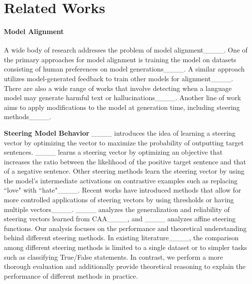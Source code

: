 \section{Related Works}
\paragraph{Model Alignment} A wide body of research addresses the problem of model alignment____. One of the primary approaches for model alignment is training the model on datasets consisting of human preferences on model generations____. A similar approach utilizes model-generated feedback to train other models for alignment____. There are also a wide range of works that involve detecting when a language model may generate harmful text or hallucinations____. Another line of work aims to apply modifications to the model at generation time, including steering methods____. 

\textbf{Steering Model Behavior} ____ introduces the idea of learning a steering vector by optimizing the vector to maximize the probability of outputting target sentences. ____ learns a steering vector by optimizing an objective that increases the ratio between the likelihood of the positive target sentence and that of a negative sentence. Other steering methods learn the steering vector by using the model's intermediate activations on contrastive examples such as replacing ``love" with ``hate"____. Recent works have introduced methods that allow for more controlled applications of steering vectors by using thresholds or having multiple vectors____. ____ analyzes the generalization and reliability of steering vectors learned from CAA____, and ____ analyzes affine steering functions. Our analysis focuses on the performance and theoretical understanding behind different steering methods. In existing literature____, the comparison among different steering methods is limited to a single dataset or to simpler tasks such as classifying True/False statements. In contrast, we perform a more thorough evaluation and additionally provide theoretical reasoning to explain the performance of different methods in practice.